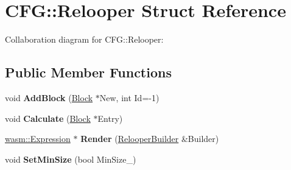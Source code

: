 \hypertarget{struct_c_f_g_1_1_relooper}{}\section{C\+FG\+:\+:Relooper Struct Reference}
\label{struct_c_f_g_1_1_relooper}


Collaboration diagram for C\+FG\+:\+:Relooper\+:
\subsection*{Public Member Functions}
\begin{DoxyCompactItemize}
\item 
\mbox{\label{struct_c_f_g_1_1_relooper_ae7e6b8e61824b6aaf022a417fa4c13ce}} 
void {\bfseries Add\+Block} (\mbox{\hyperlink{struct_c_f_g_1_1_block}{Block}} $\ast$New, int Id=-\/1)
\item 
\mbox{\label{struct_c_f_g_1_1_relooper_a2bfb45480bf76394af142f86bcff4600}} 
void {\bfseries Calculate} (\mbox{\hyperlink{struct_c_f_g_1_1_block}{Block}} $\ast$Entry)
\item 
\mbox{\label{struct_c_f_g_1_1_relooper_a3d2428c0fd88ae9c69119dd9263078d4}} 
\mbox{\hyperlink{classwasm_1_1_expression}{wasm\+::\+Expression}} $\ast$ {\bfseries Render} (\mbox{\hyperlink{class_c_f_g_1_1_relooper_builder}{Relooper\+Builder}} \&Builder)
\item 
\mbox{\label{struct_c_f_g_1_1_relooper_a576d5761c709937b1da04f1dfbf31b80}} 
void {\bfseries Set\+Min\+Size} (bool Min\+Size\+\_\+)
\end{DoxyCompactItemize}

